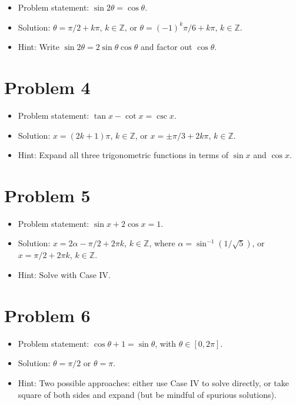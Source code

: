 \documentclass{amsart}
\begin{document}
\begin{itemize}
  \item Problem statement: $\sin 2\theta = \cos \theta$.
  \item Solution: $\theta = \pi/2 + k \pi$, $k \in \mathbb{Z}$, or $\theta = (-1)^k \pi/6 + k \pi$, $k \in \mathbb{Z}$.
  \item Hint: Write $\sin 2\theta = 2\sin\theta \cos\theta$ and factor out $\cos\theta$.
  \end{itemize}  

  \section*{Problem 4}

\begin{itemize}
  \item Problem statement: $\tan x - \cot x = \csc x$.
  \item Solution: $x = (2k + 1)\pi$, $k \in \mathbb{Z}$, or $x = \pm \pi/3 + 2k\pi$, $k \in \mathbb{Z}$.
  \item Hint: Expand all three trigonometric functions in terms of $\sin x$ and $\cos x$.
  \end{itemize}  

  \section*{Problem 5}

\begin{itemize}
  \item Problem statement: $\sin x + 2 \cos x = 1$.
  \item Solution: $x = 2\alpha - \pi/2 + 2\pi k$, $k \in \mathbb{Z}$, where $\alpha = \sin^{-1}(1/\sqrt{5})$, or $x = \pi/2 + 2\pi k$, $k \in \mathbb{Z}$.
  \item Hint: Solve with Case IV.
  \end{itemize}  


  \section*{Problem 6}

\begin{itemize}
  \item Problem statement: $\cos \theta + 1  = \sin \theta$, with $\theta \in [0, 2\pi]$.
  \item Solution: $\theta = \pi/2$ or $\theta = \pi$.
  \item Hint: Two possible approaches: either use Case IV to solve directly, or take square of both sides and expand (but be mindful of spurious solutions).
  \end{itemize}  
\end{document}
